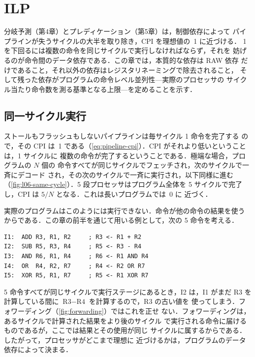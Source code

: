 \documentclass[../main.tex]{subfiles}
\begin{document}
\chapter{ILP}

分岐予測（第4章）とプレディケーション（第5章）は，制御依存によって
パイプラインが失うサイクルの大半を取り除き，CPI を理想値の~1 に近づける．
1 を下回るには複数の命令を同じサイクルで実行しなければならず，それを
妨げるのが命令間のデータ依存である．この章では，本質的な依存は RAW 依存
だけであること，それ以外の依存はレジスタリネーミングで除去されること，
そして残った依存がプログラムの命令レベル並列性---実際のプロセッサの
サイクル当たり命令数を測る基準となる上限---を定めることを示す．

\section{同一サイクル実行}
\label{sec:l06-same-cycle}

ストールもフラッシュもしないパイプラインは毎サイクル 1 命令を完了する
ので，その CPI は~1 である（\cref{eq:pipeline-cpi}）．CPI がそれより低いということは，1 サイクルに
複数の命令が完了するということである．極端な場合，プログラムの $N$ 個の
命令すべてが同じサイクルでフェッチされ，次のサイクルで一斉にデコード
され，その次のサイクルで一斉に実行され，以下同様に進む
（\cref{fig:l06-same-cycle}）．5 段プロセッサはプログラム全体を
5 サイクルで完了し，CPI は $5/N$ となる．これは長いプログラムでは~0 に
近づく．

実際のプログラムはこのようには実行できない．命令が他の命令の結果を使う
からである．この章の前半を通じて用いる例として，次の 5 命令を考える．%
\begin{marginfigure}
  \resizebox{\linewidth}{!}{}
  \caption{理想的な場合．$N$ 個の命令すべてが同じ 5 サイクルで各ステージ
    を通過する．}
  \label{fig:l06-same-cycle}
\end{marginfigure}
\begin{lstlisting}[language={[x86masm]Assembler}, numbers=none]
I1:  ADD R3, R1, R2     ; R3 <- R1 + R2
I2:  SUB R5, R3, R4     ; R5 <- R3 - R4
I3:  AND R6, R1, R4     ; R6 <- R1 AND R4
I4:  OR  R4, R2, R7     ; R4 <- R2 OR R7
I5:  XOR R5, R1, R7     ; R5 <- R1 XOR R7
\end{lstlisting}
5 命令すべてが同じサイクルで実行ステージにあるとき，I2 は，I1 がまだ R3
を計算している間に $\text{R3} - \text{R4}$ を計算するので，R3 の古い値を
使ってしまう．フォワーディング（\cref{fig:forwarding}）ではこれを正せ
ない．フォワーディングは，あるサイクルで計算された結果をより後のサイクル
で実行される命令に届けるものであるが，ここでは結果とその使用が同じ
サイクルに属するからである．したがって，プロセッサがどこまで理想に
近づけるかは，プログラムのデータ依存によって決まる．
\end{document}
